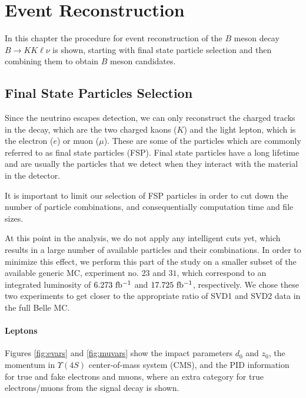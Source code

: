 \chapter{Event Reconstruction}

In this chapter the procedure for event reconstruction of the $B$ meson decay $B \to K K \ell \nu$ is shown, starting with final state particle selection and then combining them to obtain $B$ meson candidates.

\section{Final State Particles Selection}
Since the neutrino escapes detection, we can only reconstruct the charged tracks in the decay, which are the two charged kaons ($K$) and the light lepton, which is the electron ($e$) or muon ($\mu$). These are some of the particles which are commonly referred to as final state particles (FSP). Final state particles have a long lifetime and are usually the particles that we detect when they interact with the material in the detector.

It is important to limit our selection of FSP particles in order to cut down the number of particle combinations, and consequentially computation time and file sizes.

At this point in the analysis, we do not apply any intelligent cuts yet, which results in a large number of available particles and their combinations. In order to minimize this effect, we perform this part of the study on a smaller subset of the available generic MC, experiment no. $23$ and $31$, which correspond to an integrated luminosity of $6.273\mathrm{~fb^{-1}}$ and $17.725\mathrm{~fb^{-1}}$, respectively. We chose these two experiments to get closer to the appropriate ratio of SVD1 and SVD2 data in the full Belle MC.

\subsubsection{Leptons}

Figures \ref{fig:evars} and \ref{fig:muvars} show the impact parameters $d_0$ and $z_0$, the momentum in  $\Upsilon(4S)$ center-of-mass system (CMS), and the PID information for true and fake electrons and muons, where an extra category for true electrons/muons from the signal decay is shown.


